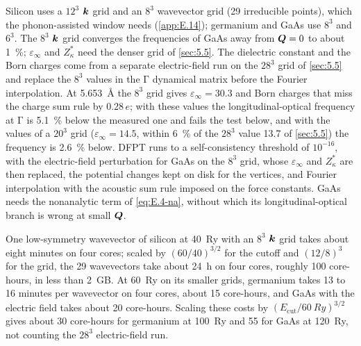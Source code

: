 Silicon uses a $12^3$ $\bm{k}$ grid and an $8^3$ wavevector grid (29 irreducible points), which the phonon-assisted window needs (\cref{app:E.14}); germanium and GaAs use $8^3$ and $6^3$. The $8^3$ $\bm{k}$ grid converges the frequencies of GaAs away from $\bm{Q} = 0$ to about \SI{1}{\percent}; $\varepsilon_\infty$ and $Z^*_\kappa$ need the denser grid of \cref{sec:5.5}. The dielectric constant and the Born charges come from a separate electric-field run on the $28^3$ grid of \cref{sec:5.5} and replace the $8^3$ values in the $\mathrm{\Gamma}$ dynamical matrix before the Fourier interpolation. At \SI{5.653}{\angstrom} the $8^3$ grid gives $\varepsilon_\infty = 30.3$ and Born charges that miss the charge sum rule by $0.28\,e$; with these values the longitudinal-optical frequency at $\mathrm{\Gamma}$ is \SI{5.1}{\percent} below the measured one and fails the test below, and with the values of a $20^3$ grid ($\varepsilon_\infty = 14.5$, within \SI{6}{\percent} of the $28^3$ value 13.7 of \cref{sec:5.5}) the frequency is \SI{2.6}{\percent} below. DFPT runs to a self-consistency threshold of $10^{-16}$, with the electric-field perturbation for GaAs on the $8^3$ grid, whose $\varepsilon_\infty$ and $Z^*_\kappa$ are then replaced, the potential changes kept on disk for the vertices, and Fourier interpolation with the acoustic sum rule imposed on the force constants. GaAs needs the nonanalytic term of \cref{eq:E.4-na}, without which its longitudinal-optical branch is wrong at small $\bm{Q}$.

One low-symmetry wavevector of silicon at \SI{40}{Ry} with an $8^3$ $\bm{k}$ grid takes about eight minutes on four cores; scaled by $(60/40)^{3/2}$ for the cutoff and $(12/8)^3$ for the grid, the 29 wavevectors take about \SI{24}{h} on four cores, roughly 100 core-hours, in less than \SI{2}{GB}. At \SI{60}{Ry} on its smaller grids, germanium takes 13 to 16 minutes per wavevector on four cores, about 15 core-hours, and GaAs with the electric field takes about 20 core-hours. Scaling these costs by $(E_{\mathrm{cut}}/\SI{60}{Ry})^{3/2}$ gives about 30 core-hours for germanium at \SI{100}{Ry} and 55 for GaAs at \SI{120}{Ry}, not counting the $28^3$ electric-field run.

